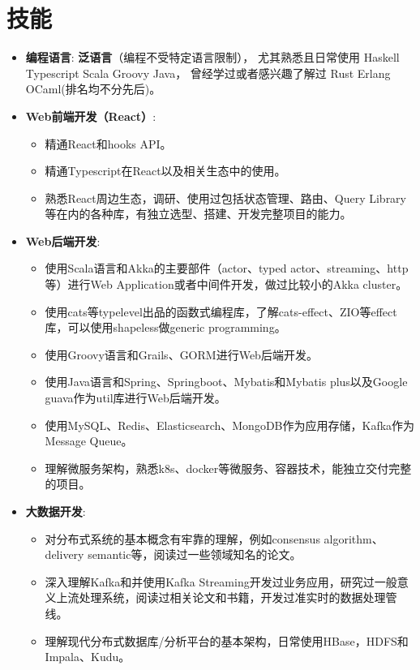 \documentclass{resume}
\begin{document}
\section{技能}
\begin{itemize}[parsep=0.25ex]
\item
\textbf{编程语言}:
\textbf{泛语言}（编程不受特定语言限制），
尤其熟悉且日常使用 Haskell Typescript Scala Groovy Java，
曾经学过或者感兴趣了解过 Rust Erlang OCaml(排名均不分先后)。
\item
\textbf{Web前端开发（React）}:
\begin{itemize}[parsep=0.25ex]
\item 精通React和hooks API。
\item 精通Typescript在React以及相关生态中的使用。
\item 熟悉React周边生态，调研、使用过包括状态管理、路由、Query Library等在内的各种库，有独立选型、搭建、开发完整项目的能力。
\end{itemize}
\item
\textbf{Web后端开发}:
\begin{itemize}[parsep=0.25ex]
\item 使用Scala语言和Akka的主要部件（actor、typed actor、streaming、http等）进行Web Application或者中间件开发，做过比较小的Akka cluster。
\item 使用cats等typelevel出品的函数式编程库，了解cats-effect、ZIO等effect库，可以使用shapeless做generic programming。
\item 使用Groovy语言和Grails、GORM进行Web后端开发。
\item 使用Java语言和Spring、Springboot、Mybatis和Mybatis plus以及Google guava作为util库进行Web后端开发。
\item 使用MySQL、Redis、Elasticsearch、MongoDB作为应用存储，Kafka作为Message Queue。
\item 理解微服务架构，熟悉k8s、docker等微服务、容器技术，能独立交付完整的项目。
\end{itemize}
\item
\textbf{大数据开发}:
\begin{itemize}[parsep=0.25ex]
\item 对分布式系统的基本概念有牢靠的理解，例如consensus algorithm、delivery semantic等，阅读过一些领域知名的论文。
\item 深入理解Kafka和并使用Kafka Streaming开发过业务应用，研究过一般意义上流处理系统，阅读过相关论文和书籍，开发过准实时的数据处理管线。
\item 理解现代分布式数据库/分析平台的基本架构，日常使用HBase，HDFS和Impala、Kudu。

\end{itemize}
\end{itemize}
\end{document}
